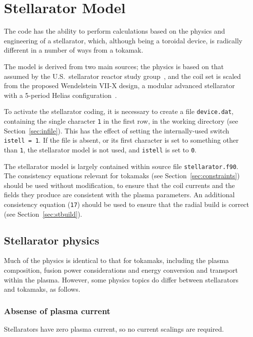 \documentclass[11pt,a4paper]{report}
\begin{document}
\section{Stellarator Model}

The code has the ability to perform calculations based on the physics and
engineering of a stellarator, which, although being a toroidal device, is
radically different in a number of ways from a tokamak.

The model is derived from two main sources; the physics is based on that
assumed by the U.S.\ stellarator reactor study group~\cite{USSRSG}, and the
coil set is scaled from the proposed Wendelstein VII-X design, a modular
advanced stellarator with a 5-period Helias configuration~\cite{W7X}.

To activate the stellarator coding, it is necessary to create a file
\texttt{device.dat}, containing the single character \texttt{1} in the first
row, in the working directory (see Section~\ref{sec:infile}). This has the
effect of setting the internally-used switch \texttt{istell = 1}. If the file
is absent, or its first character is set to something other than \texttt{1},
the stellarator model is not used, and \texttt{istell} is set to
\texttt{0}.

The stellarator model is largely contained within source file
\texttt{stellarator.f90}. The consistency equations relevant for tokamaks (see
Section~\ref{sec:constraints}) should be used without modification, to ensure
that the coil currents and the fields they produce are consistent with the
plasma parameters. An additional consistency equation (\texttt{17}) should be
used to ensure that the radial build is correct (see
Section~\ref{sec:stbuild}).

\subsection{Stellarator physics}

Much of the physics is identical to that for tokamaks, including the plasma
composition, fusion power considerations and energy conversion and transport
within the plasma. However, some physics topics do differ between stellarators
and tokamaks, as follows.

\subsubsection{Absense of plasma current}

Stellarators have zero plasma current, so no current scalings are required.
\end{document}

